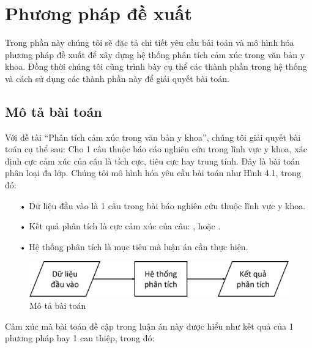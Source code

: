 \chapter{Phương pháp đề xuất}	\label{sec:phuongphapdexuat}
\thispagestyle{empty}
Trong phần này chúng tôi sẽ đặc tả chi tiết yêu cầu bài toán và mô hình hóa phương pháp đề xuất để xây dựng hệ thống phân tích cảm xúc trong văn bản y khoa. Đồng thời chúng tôi cũng trình bày cụ thể các thành phần trong hệ thống và cách sử dụng các thành phần này để giải quyết bài toán.
\pagebreak
\section{Mô tả bài toán}
Với đề tài ``Phân tích cảm xúc trong văn bản y khoa'', chúng tôi giải quyết bài toán cụ thể sau: Cho 1 câu thuộc báo cáo nghiên cứu trong lĩnh vực y khoa, xác định cực cảm xúc của câu là tích cực, tiêu cực hay trung tính. Đây là bài toán phân loại đa lớp. Chúng tôi mô hình hóa yêu cầu bài toán như Hình 4.1, trong đó:
\begin{itemize}[noitemsep]
\item[•] Dữ liệu đầu vào là 1 câu trong bài báo nghiên cứu thuộc lĩnh vực y khoa.
\item[•] Kết quả phân tích là cực cảm xúc của câu: \tichcuc, \tieucuc hoặc \trungtinh.
\item[•] Hệ thống phân tích là mục tiêu mà luận án cần thực hiện.
\end{itemize}
\begin{figure}[h]
\centering
\includegraphics[scale=0.2]{../hinh/mo_ta_bai_toan.png}
\caption{Mô tả bài toán} \label{fig:mo-ta-bai-toan}
\end{figure}
Cảm xúc mà bài toán đề cập trong luận án này được hiểu như kết quả của 1 phương pháp hay 1 can thiệp, trong đó:
